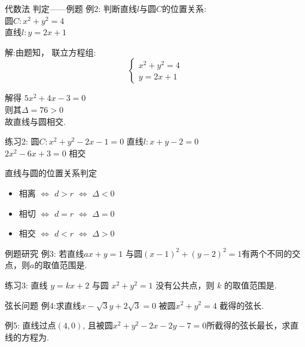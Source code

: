\documentclass[12pt]{beamer}
\begin{document}
	\begin{frame}{代数法 判定——例题}
		\textcolor[rgb]{0.15,0.7,0.15}{例2: }判断直线$l$与圆$C$的位置关系:\\
		圆$C: x^2+y^2=4$\\
		直线$l: y=2x+1$ \pause

		{\color{cyan} 解:由题知，
		联立方程组: \[\left\{ \begin{array}{l}
		x^2+y^2=4 \\
		y=2x+1
		\end{array} \right.\] \pause

		解得 $5x^2+4x-3=0$\\ \pause
		则其$\Delta = 76 > 0$\\ \pause
		故直线与圆相交.
		}\pause

		\textcolor[rgb]{0.15,0.7,0.15}{练习2: }圆$C: x^2+y^2-2x-1=0$\hspace{2pt}
		直线$l: x+y-2=0$\\ \pause
		{\color{cyan} $2x^2-6x+3=0$ \hspace{5pt}相交 }
	\end{frame}

	\begin{frame}{直线与圆的位置关系判定}
		\begin{itemize}[<+- | alert@+>]
			\item 相离 $\Longleftrightarrow$ $d>r$ $\Longleftrightarrow$ $\Delta < 0$
			\item 相切 $\Longleftrightarrow$ $d=r$ $\Longleftrightarrow$ $\Delta = 0$
			\item 相交 $\Longleftrightarrow$ $d<r$ $\Longleftrightarrow$ $\Delta > 0$
		\end{itemize}
	\end{frame}

	\begin{frame}{例题研究}
		\textcolor[rgb]{0.15,0.7,0.15}{例3: }若直线$ax+y=1$ 与圆$(x-1)^2+(y-2)^2=1$有两个不同的交点，则$a$的取值范围是\underline{}.\\\pause\vspace{10pt}

		\textcolor[rgb]{0.15,0.7,0.15}{练习3: }直线 $y=kx+2$ 与圆 $x^2+y^2=1$ 没有公共点，则 $k$ 的取值范围是.
	\end{frame}

\begin{frame}{弦长问题}
	\textcolor[rgb]{0.15,0.7,0.15}{例4:}求直线$x-\sqrt{3}y+2\sqrt{3}=0$ 被圆$x^2+y^2=4$ 截得的弦长. \pause

	\vspace{20pt}

	\textcolor[rgb]{0.15,0.7,0.15}{例5: } 直线过点$(4,0)$, 且被圆$x^2+y^2-2x-2y-7=0$所截得的弦长最长，求直线的方程为.
\end{frame}
%
%
\end{document}
